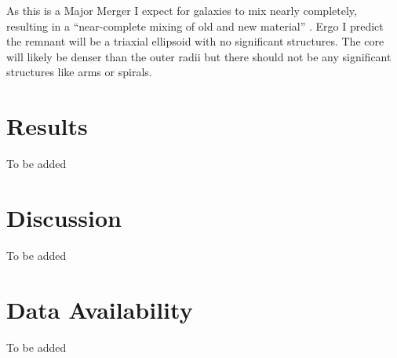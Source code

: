 \documentclass[fleqn,usenatbib]{mnras}
\begin{document}
As this is a Major Merger I expect for galaxies to mix nearly completely, resulting in a “near-complete mixing of old and new material” \cite{Frenk_2012}. Ergo I predict the remnant will be a triaxial ellipsoid with no significant structures. The core will likely be denser than the outer radii but there should not be any significant structures like arms or spirals.


\section{Results}
To be added
\section{Discussion}
To be added
\section*{Data Availability}
To be added














\bsp	%
\label{lastpage}
\end{document}
